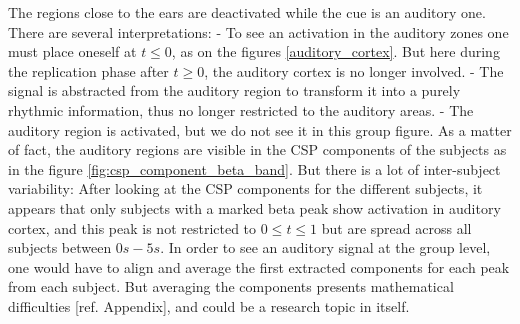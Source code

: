 The regions close to the ears are deactivated while the cue is an auditory one. There are several interpretations:
- To see an activation in the auditory zones one must place oneself at $t \leq 0$, as on the figures \ref{auditory_cortex}. But here during the replication phase after $t \geq 0$, the auditory cortex is no longer involved.
- The signal is abstracted from the auditory region to transform it into a purely rhythmic information, thus no longer restricted to the auditory areas.
- The auditory region is activated, but we do not see it in this group figure. As a matter of fact, the auditory regions are visible in the CSP components of the subjects as in the figure \ref{fig:csp_component_beta_band}. But there is a lot of inter-subject variability: After looking at the CSP components for the different subjects, it appears that only subjects with a marked beta peak show activation in auditory cortex, and this peak is not restricted to $0 \leq t \leq 1$ but are spread across all subjects between $0s - 5s$. In order to see an auditory signal at the group level, one would have to align and average the first extracted components for each peak from each subject. But averaging the components presents mathematical difficulties [ref. Appendix], and could be a research topic in itself.



